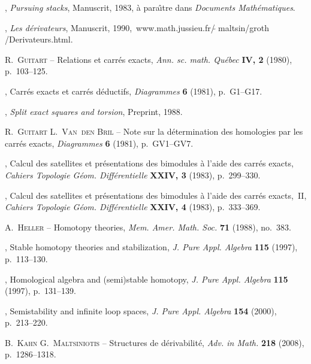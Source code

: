 \documentclass[francais]{smfart}
\theoremstyle{plain}
\theoremstyle{remark}
\theoremstyle{definition}
\numberwithin{equation}{thm}
\begin{document}
\begin{thebibliography}{10}
\bysame , {\og \emph{Pursuing stacks}\fg}, Manuscrit, 1983, \`a para\^\i tre
  dans \emph{Documents Ma\-th\'e\-ma\-tiques}.

\bysame , {\og \emph{Les d\'erivateurs}\fg}, Manuscrit,
  1990,~www.math.jussieu.fr/\raise -3.3pt\vbox{\hbox{$\widetilde{ \
  }\,$}}maltsin/groth \hbox{/Derivateurs.html}.

{\scshape R.~Guitart} -- {\og Relations et carr\'es exacts\fg}, \emph{Ann. sc.
  math. Qu\'ebec} \textbf{IV, 2} (1980), p.~103--125.

\bysame , {\og Carrés exacts et carrés déductifs\fg}, \emph{Diagrammes}
  \textbf{6} (1981), p.~G1--G17.

\bysame , {\og \emph{Split exact squares and torsion}\fg}, Preprint, 1988.

{\scshape R.~Guitart {\normalfont \smfandname} L.~Van~den Bril} -- {\og Note
  sur la détermination des homologies par les carrés exacts\fg},
  \emph{Diagrammes} \textbf{6} (1981), p.~GV1--GV7.

\bysame , {\og Calcul des satellites et présentations des bimodules à l'aide
  des carrés exacts\fg}, \emph{Cahiers Topologie Géom. Différentielle}
  \textbf{XXIV, 3} (1983), p.~299--330.

\bysame , {\og Calcul des satellites et présentations des bimodules à l'aide
  des carrés exacts,~{II}\fg}, \emph{Cahiers Topologie Géom. Différentielle}
  \textbf{XXIV, 4} (1983), p.~333--369.

{\scshape A.~Heller} -- {\og Homotopy theories\fg}, \emph{Mem. Amer. Math.
  Soc.} \textbf{71} (1988), no.~383.

\bysame , {\og Stable homotopy theories and stabilization\fg}, \emph{J. Pure
  Appl. Algebra} \textbf{115} ({\relax}1997), p.~113--130.

\bysame , {\og Homological algebra and (semi)stable homotopy\fg}, \emph{J. Pure
  Appl. Algebra} \textbf{115} ({\relax}1997), p.~131--139.

\bysame , {\og Semistability and infinite loop spaces\fg}, \emph{J. Pure Appl.
  Algebra} \textbf{154} ({\relax}2000), p.~213--220.

{\scshape B.~Kahn {\normalfont \smfandname} G.~Maltsiniotis} -- {\og Structures
  de d\'erivabilit\'e\fg}, \emph{Adv. in Math.} \textbf{218} (2008),
  p.~1286--1318.


\end{thebibliography}
\end{document}
